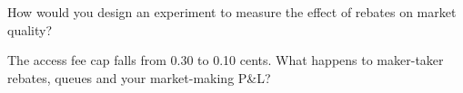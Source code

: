\begin{interviewq}\label{iq:mx:fees-rebates-and-venue-economics:5}
How would you design an experiment to measure the effect of rebates on market quality?
\end{interviewq}

\begin{interviewq}\label{iq:mx:fees-rebates-and-venue-economics:6}
The access fee cap falls from 0.30 to 0.10 cents. What happens to maker-taker rebates, queues and your market-making P\&L?
\end{interviewq}
